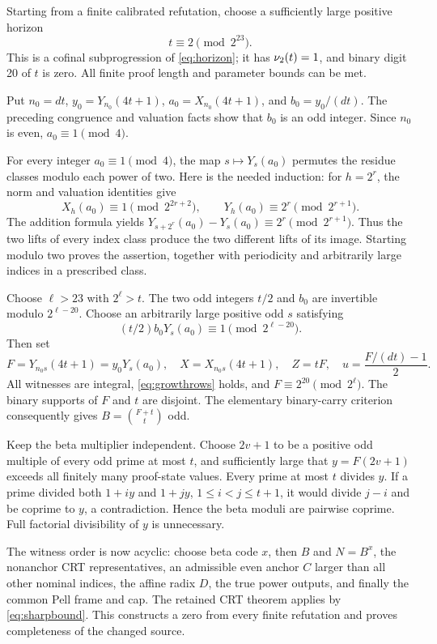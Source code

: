 Starting from a finite calibrated refutation, choose a sufficiently large
positive horizon
\begin{equation}\label{eq:cofinalt}
 t\equiv2\pmod{2^{23}}.
\end{equation}
This is a cofinal subprogression of \eqref{eq:horizon}; it has
\(\nu_2(t)=1\), and binary digit 20 of \(t\) is zero. All finite proof
length and parameter bounds can be met.

Put \(n_0=dt\), \(y_0=Y_{n_0}(4t+1)\),
\(a_0=X_{n_0}(4t+1)\), and \(b_0=y_0/(dt)\).
The preceding congruence and valuation facts show that \(b_0\) is an
odd integer. Since \(n_0\) is even, \(a_0\equiv1\pmod4\).

For every integer \(a_0\equiv1\pmod4\), the map
\(s\mapsto Y_s(a_0)\) permutes the residue classes modulo each power
of two. Here is the needed induction: for \(h=2^r\), the norm and
valuation identities give
\[
 X_h(a_0)\equiv1\pmod{2^{2r+2}},\qquad
 Y_h(a_0)\equiv2^r\pmod{2^{r+1}}.
\]
The addition formula yields
\(Y_{s+2^r}(a_0)-Y_s(a_0)\equiv2^r\pmod{2^{r+1}}\).
Thus the two lifts of every index class produce the two different lifts
of its image. Starting modulo two proves the assertion, together with
periodicity and arbitrarily large indices in a prescribed class.

Choose \(\ell>23\) with \(2^\ell>t\). The two odd integers \(t/2\)
and \(b_0\) are invertible modulo \(2^{\ell-20}\). Choose an arbitrarily
large positive odd \(s\) satisfying
\[
 (t/2)b_0Y_s(a_0)\equiv1\pmod{2^{\ell-20}}.
\]
Then set
\[
 F=Y_{n_0s}(4t+1)=y_0Y_s(a_0),\quad
 X=X_{n_0s}(4t+1),\quad Z=tF,\quad
 u=\frac{F/(dt)-1}{2}.
\]
All witnesses are integral, \eqref{eq:growthrows} holds, and
\(F\equiv2^{20}\pmod{2^\ell}\). The binary supports of \(F\) and \(t\)
are disjoint. The elementary binary-carry criterion consequently gives
\(B=\binom{F+t}{t}\) odd.

Keep the beta multiplier independent. Choose \(2v+1\) to be a positive
odd multiple of every odd prime at most \(t\), and sufficiently large
that \(y=F(2v+1)\) exceeds all finitely many proof-state values. Every
prime at most \(t\) divides \(y\). If a prime divided both \(1+iy\)
and \(1+jy\), \(1\le i<j\le t+1\), it would divide \(j-i\) and be
coprime to \(y\), a contradiction. Hence the beta moduli are pairwise
coprime. Full factorial divisibility of \(y\) is unnecessary.

The witness order is now acyclic: choose beta code \(x\), then \(B\) and
\(N=B^x\), the nonanchor CRT representatives, an admissible even anchor
\(C\) larger than all other nominal indices, the affine radix \(D\),
the true power outputs, and finally the common Pell frame and cap.
The retained CRT theorem applies by \eqref{eq:sharpbound}. This constructs
a zero from every finite refutation and proves completeness of the changed
source.

